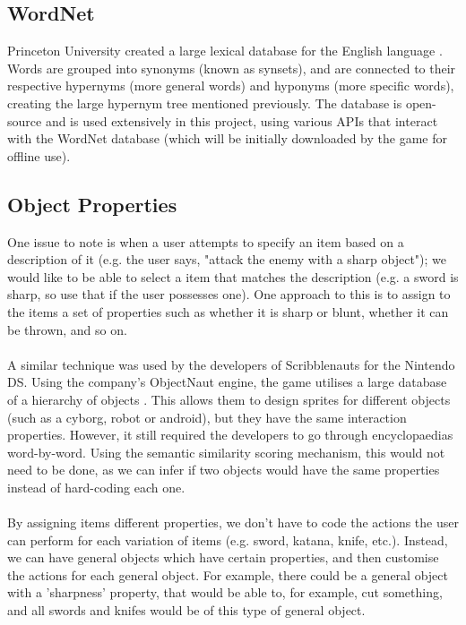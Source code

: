 \documentclass[12pt]{article}
\begin{document}
\subsection{WordNet}

Princeton University created a large lexical database for the English language \cite{RefWorks:20}. Words are grouped into synonyms (known as synsets), and are connected to their respective hypernyms (more general words) and hyponyms (more specific words), creating the large hypernym tree mentioned previously. The database is open-source and is used extensively in this project, using various APIs that interact with the WordNet database (which will be initially downloaded by the game for offline use).

\subsection{Object Properties}

One issue to note is when a user attempts to specify an item based on a description of it (e.g. the user says, "attack the enemy with a sharp object"); we would like to be able to select a item that matches the description (e.g. a sword is sharp, so use that if the user possesses one). One approach to this is to assign to the items a set of properties such as whether it is sharp or blunt, whether it can be thrown, and so on.
\\
\\
A similar technique was used by the developers of Scribblenauts for the Nintendo DS. Using the company's ObjectNaut engine, the game utilises a large database of a hierarchy of objects \cite{RefWorks:48}. This allows them to design sprites for different objects (such as a cyborg, robot or android), but they have the same interaction properties. However, it still required the developers to go through encyclopaedias word-by-word. Using the semantic similarity scoring mechanism, this would not need to be done, as we can infer if two objects would have the same properties instead of hard-coding each one.
\\
\\
By assigning items different properties, we don't have to code the actions the user can perform for each variation of items (e.g. sword, katana, knife, etc.). Instead, we can have general objects which have certain properties, and then customise the actions for each general object. For example, there could be a general object with a 'sharpness' property, that would be able to, for example, cut something, and all swords and knifes would be of this type of general object.
\newpage
\end{document}
